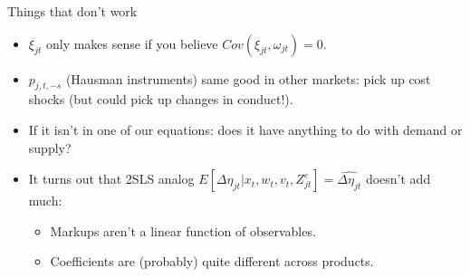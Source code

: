 \documentclass[xcolor=pdftex,dvipsnames,table,mathserif,aspectratio=169]{beamer}
\begin{document}
\begin{frame}{Things that don't work}
\begin{itemize}
\item $\xi_{jt}$ only makes sense if you believe $Cov(\xi_{jt},\omega_{jt})=0$.
\item $p_{j,t,-s}$ (Hausman instruments) same good in other markets: pick up cost shocks (but could pick up changes in conduct!). 
\item If it isn't in one of our equations: does it have anything to do with demand or supply?
\item It turns out that 2SLS analog $E[\Delta \eta_{jt} | x_t, w_t, v_t,Z_{jt}^e]=\widehat{\Delta \eta_{jt}}$ doesn't add much:
\begin{itemize}
\item Markups aren't a linear function of observables.
\item Coefficients are (probably) quite different across products.
\end{itemize}
\end{itemize}
\end{frame}
\end{document}

